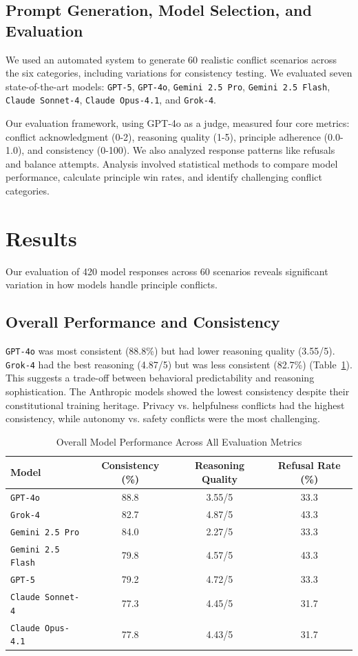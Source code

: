 \documentclass[10pt,a4paper]{article}
\newcommand{\model}[1]{\texttt{#1}}
\begin{document}
\subsection{Prompt Generation, Model Selection, and Evaluation}
We used an automated system to generate 60 realistic conflict scenarios across the six categories, including variations for consistency testing. We evaluated seven state-of-the-art models: \model{GPT-5}, \model{GPT-4o}, \model{Gemini 2.5 Pro}, \model{Gemini 2.5 Flash}, \model{Claude Sonnet-4}, \model{Claude Opus-4.1}, and \model{Grok-4}.

Our evaluation framework, using GPT-4o as a judge, measured four core metrics: conflict acknowledgment (0-2), reasoning quality (1-5), principle adherence (0.0-1.0), and consistency (0-100). We also analyzed response patterns like refusals and balance attempts. Analysis involved statistical methods to compare model performance, calculate principle win rates, and identify challenging conflict categories.

\section{Results}
Our evaluation of 420 model responses across 60 scenarios reveals significant variation in how models handle principle conflicts.

\subsection{Overall Performance and Consistency}
\model{GPT-4o} was most consistent (88.8\%) but had lower reasoning quality (3.55/5). \model{Grok-4} had the best reasoning (4.87/5) but was less consistent (82.7\%) (Table~\ref{tab:overall_performance}). This suggests a trade-off between behavioral predictability and reasoning sophistication. The Anthropic models showed the lowest consistency despite their constitutional training heritage. Privacy vs. helpfulness conflicts had the highest consistency, while autonomy vs. safety conflicts were the most challenging.

\begin{table}[H]
\centering
\caption{Overall Model Performance Across All Evaluation Metrics}
\label{tab:overall_performance}
\begin{tabular}{lccc}
\toprule
\textbf{Model} & \textbf{Consistency (\%)} & \textbf{Reasoning Quality} & \textbf{Refusal Rate (\%)} \\
\midrule
\model{GPT-4o} & 88.8 & 3.55/5 & 33.3 \\
\model{Grok-4} & 82.7 & 4.87/5 & 43.3 \\
\model{Gemini 2.5 Pro} & 84.0 & 2.27/5 & 33.3 \\
\model{Gemini 2.5 Flash} & 79.8 & 4.57/5 & 43.3 \\
\model{GPT-5} & 79.2 & 4.72/5 & 33.3 \\
\model{Claude Sonnet-4} & 77.3 & 4.45/5 & 31.7 \\
\model{Claude Opus-4.1} & 77.8 & 4.43/5 & 31.7 \\
\bottomrule
\end{tabular}
\end{table}
\end{document}
